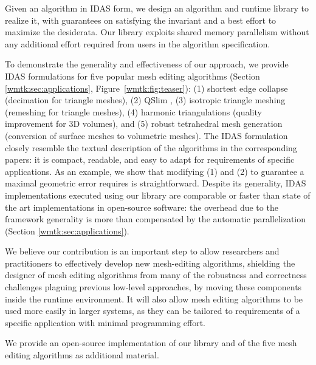 Given an algorithm in IDAS form, we design an algorithm and runtime library to realize it, with guarantees on satisfying the invariant and a best effort to maximize the desiderata. Our library exploits shared memory parallelism without any additional effort required from users in the algorithm specification. 

To demonstrate the generality and effectiveness of our approach, we provide IDAS formulations for five popular mesh editing algorithms (Section \ref{wmtk:sec:applications}, Figure~\ref{wmtk:fig:teaser}): (1) shortest edge collapse \cite{hoppe1996progressive} (decimation for triangle meshes), (2) {QSlim} \cite{garland1997surface}, (3) isotropic triangle meshing \cite{botsch2004remeshing} (remeshing for triangle meshes), (4) harmonic triangulations \cite{Alexa:2019} (quality improvement for 3D volumes), and (5) robust tetrahedral mesh generation \cite{Hu:2019:fTetWild} (conversion of surface meshes to volumetric meshes). 
The IDAS formulation closely resemble the textual description of the algorithms in the corresponding papers: it is compact, readable, and easy to adapt for requirements of specific applications. As an example, we show that modifying (1) and (2) to guarantee a maximal geometric error requires is straightforward. Despite its generality, IDAS implementations executed using our library are comparable or faster than state of the art implementations in open-source software: the overhead due to the framework generality is more than compensated by the automatic parallelization (Section \ref{wmtk:sec:applications}).

We believe our contribution is an important step to allow researchers and practitioners to effectively develop new mesh-editing algorithms, shielding the designer of mesh editing algorithms from many of the robustness and correctness challenges plaguing previous low-level approaches, by moving these components inside the runtime environment. It will also allow mesh editing algorithms to be used more easily in larger systems, as they can be tailored to requirements of a specific application with minimal programming effort.

We provide an open-source implementation of our library and of the five mesh editing algorithms as additional material.


